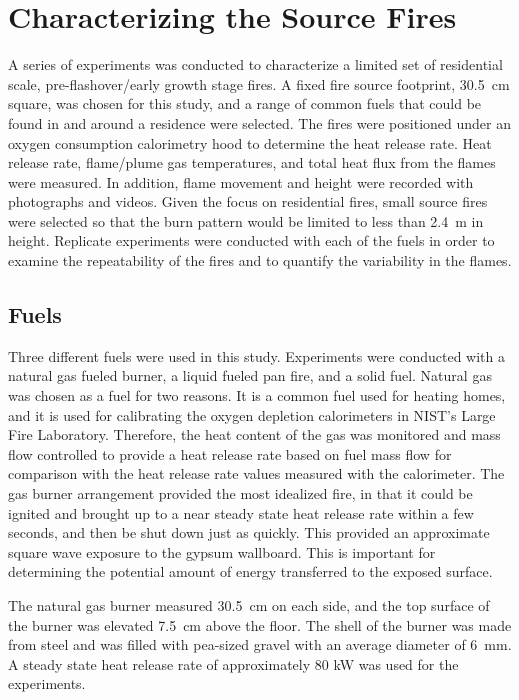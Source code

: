 \documentclass[twoside]{uocthesis}
\begin{document}
{\chapter{Characterizing the Source Fires}
\label{chapter:Characterizing the Source Fires}

A series of experiments was conducted to characterize a limited set of  residential scale, pre-flashover/early growth stage fires.  A fixed fire source footprint, 30.5~cm square, was chosen for this study, and a range of common fuels that could be found in and around a residence were selected.  The fires were positioned under an oxygen consumption calorimetry hood to determine the heat release rate.  Heat release rate, flame/plume gas temperatures, and total heat flux from the flames were measured.  In addition, flame movement and height were recorded with photographs and videos.  Given the focus on residential fires, small source fires were selected so that the burn pattern would be limited to less than 2.4~m in height.  Replicate experiments were conducted with each of the fuels in order to examine the repeatability of the fires and to quantify the variability in the flames.

\section{Fuels}

Three different fuels were used in this study.  Experiments were conducted with a natural gas fueled burner, a liquid fueled pan fire, and a solid fuel. Natural gas was chosen as a fuel for two reasons.  It is a common fuel used for heating homes, and it is used for calibrating the oxygen depletion calorimeters in NIST's Large Fire Laboratory.  Therefore, the heat content of the gas was monitored and mass flow controlled to provide a heat release rate based on fuel mass flow for comparison with the heat release rate values measured with the calorimeter.  The gas burner arrangement provided the most idealized fire, in that it could be ignited and brought up to a near steady state heat release rate within a few seconds, and then be shut down just as quickly.  This provided an approximate square wave exposure to the gypsum wallboard.  This is important for determining the potential amount of energy transferred to the exposed surface.

The natural gas burner measured 30.5~cm on each side, and the top surface of the burner was elevated 7.5~cm above the floor. The shell of the burner was made from steel and was filled with pea-sized gravel with an average diameter of 6~mm.  A steady state heat release rate of approximately 80 kW was used for the experiments.

}
\end{document}

